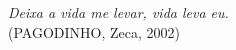 
\renewcommand{\epigraphname}{EPÍGRAFE}

\begin{epigrafe}

\textit{Deixa a vida me levar, vida leva eu.}
\\  \hspace*{\fill} (PAGODINHO, Zeca, 2002)

\end{epigrafe}
